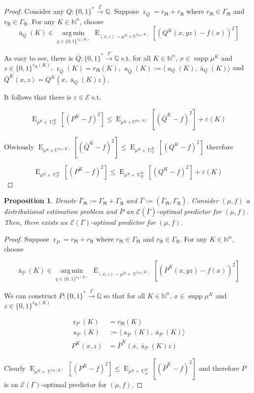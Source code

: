 \documentclass{article}
\numberwithin{equation}{section}
\theoremstyle{definition}
\theoremstyle{plain}
\newtheorem{proposition}{Proposition}[section]
\newcommand{\Bool}{\{0,1\}}
\newcommand{\Words}{{\Bool^*}}
\newcommand{\WordsLen}[1]{{\Bool^{#1}}}
\DeclareMathOperator{\Supp}{supp}
\DeclareMathOperator{\E}{E}
\DeclareMathOperator{\R}{r}
\DeclareMathOperator{\A}{a}
\DeclareMathOperator{\Un}{U}
\newcommand{\Argmin}[1]{\underset{#1}{\operatorname{arg\,min}}\,}
\newcommand{\Nats}{\mathbb{N}}
\newcommand{\Rats}{\mathbb{Q}}
\newcommand{\Chev}[1]{\langle #1 \rangle}
\newcommand{\GrowR}{\Gamma_{\mathfrak{R}}}
\newcommand{\GrowA}{\Gamma_{\mathfrak{A}}}
\newcommand{\Fall}{\mathcal{E}}
\newcommand{\EG}{\Fall(\Gamma)}
\newcommand{\Scheme}{\xrightarrow{\Gamma}}
\begin{document}
\begin{proof}

Consider any $Q: \Words \xrightarrow{\bar{\Gamma}} \Rats$. Suppose $\R_Q=r_{\mathfrak{R}}+r_{\mathfrak{A}}$ where $r_{\mathfrak{R}} \in \GrowR$ and $r_{\mathfrak{A}} \in \GrowA$. For any $K \in \Nats^n$, choose 
\[\bar{\A}_Q(K) \in \Argmin{y \in \WordsLen{r_{\mathfrak{A}}(K)}} \E_{(x,z) \sim \mu^{K} \times U^{r_{\mathfrak{R}}(K)}}[(Q^{K}(x,yz) - f(x))^2]\]

As easy to see, there is $\bar{Q}: \Words \Scheme \Rats$ s.t. for all $K \in \Nats^n$, $x \in \Supp \mu^{K}$ and $z \in \WordsLen{r_{\mathfrak{R}}(K)}$, $\R_{\bar{Q}}(K) = r_{\mathfrak{R}}(K)$, ${\A_{\bar{Q}}(K):=\Chev{\A_Q(K),\bar{\A}_Q(K)}}$ and ${\bar{Q}^{K}(x,z)=Q^{K}(x,\bar{\A}_Q(K)z)}$.

It follows that there is $\varepsilon \in \Fall$ s.t.

$$\E_{\mu^{K} \times \Un_P^{K}}[(P^{K} - f)^2] \leq \E_{\mu^{K} \times U^{r_{\mathfrak{R}}(K)}}[(\bar{Q}^{K} - f)^2] + \varepsilon(K)$$

Obviously $\E_{\mu^{K} \times U^{r_{\mathfrak{R}}(K)}}[(\bar{Q}^{K} - f)^2] \leq \E_{\mu^{K} \times \Un_Q^{K}}[(Q^{K} - f)^2]$ therefore

$$\E_{\mu^{K} \times \Un_P^{K}}[(P^{K} - f)^2] \leq \E_{\mu^{K} \times \Un_Q^{K}}[(Q^{K} - f)^2] + \varepsilon(K)$$
\end{proof}

\begin{proposition}

Denote $\bar{\Gamma}_{\mathfrak{R}}:=\GrowR+\GrowA$ and $\bar{\Gamma}:=(\bar{\Gamma}_{\mathfrak{R}},\GrowA)$. Consider $(\mu,f)$ a distributional estimation problem and $\bar{P}$ an $\Fall(\bar{\Gamma})$-optimal predictor for $(\mu,f)$. Then, there exists an $\EG$-optimal predictor for $(\mu,f)$.

\end{proposition}

\begin{proof}

Suppose $\R_{\bar{P}}=r_{\mathfrak{R}}+r_{\mathfrak{A}}$ where $r_{\mathfrak{R}} \in \GrowR$ and $r_{\mathfrak{A}} \in \GrowA$. For any ${K \in \Nats^n}$, choose 

\[\bar{\A}_P(K) \in \Argmin{y \in \WordsLen{r_{\mathfrak{A}}(K)}} \E_{(x,z) \sim \mu^{K} \times \Un^{r_{\mathfrak{R}}(K)}}[(\bar{P}^{K}(x,yz) - f(x))^2]\]

We can construct $P: \Words \Scheme \Rats$ so that for all $K \in \Nats^n$, $x \in \Supp \mu^{K}$ and ${z \in \WordsLen{r_{\mathfrak{R}}(K)}}$

\begin{align*}
\R_P(K) &= r_{\mathfrak{R}}(K) \\
\A_P(K) &:=\Chev{\A_{\bar{P}}(K),\bar{\A}_P(K)} \\
P^{K}(x,z) &=\bar{P}^{K}(x,\bar{\A}_P(K)z)
\end{align*}

Clearly ${\E_{\mu^{K} \times \Un^{r_{\mathfrak{R}}(K)}}[(P^{K} - f)^2] \leq \E_{\mu^{K} \times \Un_{\bar{P}}^{K}}[(\bar{P}^{K} - f)^2]}$ and therefore $P$ is an $\EG$-optimal predictor for $(\mu,f)$.
\end{proof}
\end{document}

